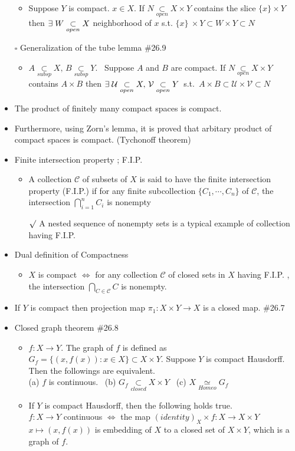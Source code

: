 \documentclass[12pt]{article}
\newcommand{\sq}{$\square$}
\newcommand{\rmk}{$\surd$}
\newcommand{\spone}{\hspace{0.1cm}}
\newcommand{\U}{\mathcal{U}}
\newcommand{\V}{\mathcal{V}}
\newcommand{\C}{\mathcal{C}}
\newcommand{\open}{\underset{open}{\subset}}
\newcommand{\closed}{\underset{closed}{\subset}}
\newcommand{\subsp}{\underset{subsp}{\subset}}
\newcommand{\exist}{\exists\spone}
\newcommand{\homeo}{\underset{Homeo}{\simeq}}
\begin{document}
\begin{itemize}
\begin{itemize}
		\item Suppose $Y$ is compact. $x\in X$. If $N\open X\times Y$ contains the slice $\{x\}\times Y$ then $\exist W\open X$ neighborhood of $x$ s.t. $\{x\}\ \times Y \subset W\times Y \subset N$
	\end{itemize}
	\item[\sq] Generalization of the tube lemma \quad \#26.9 
	\begin{itemize}
		\item $A\subsp X,\, B\subsp Y$. \, Suppose $A$ and $B$ are compact. If $N\open X\times Y$ contains $A\times B$ then $\exist \U\open X, \, \V \open Y$ \,s.t.\, $A\times B \subset \U \times \V \subset N$
	\end{itemize} 
	\item The product of finitely many compact spaces is compact.
	\item Furthermore, using Zorn's lemma, it is proved that arbitary product of compact spaces is compact. (Tychonoff theorem) 
	\item Finite intersection property ; F.I.P.
	\begin{itemize}
		\item A collection $\C$ of subsets of $X$ is said to have the finite intersection property (F.I.P.) if for any finite subcollection $\{C_1,\cdots, C_n\}$ of $\C$, the intersection $\bigcap_{i=1}^n C_i$ is nonempty
		\item[\rmk] A nested sequence of nonempty sets is a typical example of collection having F.I.P.
	\end{itemize}
	\item Dual definition of Compactness
	\begin{itemize}
		\item $X$ is compact $\Leftrightarrow$ for any collection $\C$ of closed sets in $X$ having F.I.P. , the intersection $\bigcap_{C\in \C} C$ is nonempty.
	\end{itemize}
	\item If $Y$ is compact then projection map $\pi_1 : X\times Y \rightarrow X$ is a closed map. \quad \#26.7
	\item Closed graph theorem \quad \#26.8
	\begin{itemize}
		\item $f : X\rightarrow Y$. The graph of $f$ is defined as $G_f=\{(x,f(x)):x\in X\}\subset X\times Y$. Suppose $Y$ is compact Hausdorff. Then the followings are equivalent.
		\\	(a) $f$ is continuous. \, (b) $G_f\closed X\times Y$ \, (c) $X\homeo G_f$
		\item If $Y$ is compact Hausdorff, then the following holds true. \\$f: X\rightarrow Y$ continuous $\Leftrightarrow$ the map $(identity)_{X}\times f : X\rightarrow X\times Y$ \; $x\mapsto (x, f(x))$ is embedding of $X$ to a closed set of $X\times Y$, which is a graph of $f$.
	\end{itemize}
\end{itemize}
\clearpage
\end{document}
